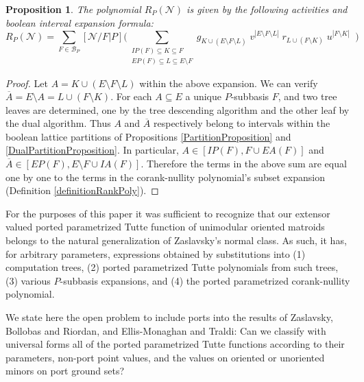\documentclass[12pt]{article}
\newcommand \comment[1]{}                       %
\renewcommand \comment[1]{\emph{#1}}            %
\newtheorem{proposition}[theorem]{Proposition}
\theoremstyle{definition}
\newcommand{\scomp}[1]{\ensuremath{\overline{#1}}}
\newcommand{\Card}[1]{\ensuremath{{\left|#1\right|}}}
\begin{document}
\begin{proposition}
The polynomial $R_P(\mathcal{N})$ is given
by the following activities and boolean interval expansion formula:
\begin{equation}
R_P(\mathcal{N})=
\sum_{F\in \mathcal{B}_P}[\mathcal{N}/F|P]
\Big(
\sum_{\substack{
       IP(F)\subseteq K \subseteq F\\
       EP(F)\subseteq L \subseteq E\setminus F
      }}
 g_{K\cup (E\setminus F\setminus L)}\;
 v^{\Card{E\setminus F\setminus L}}\;
 r_{L\cup (F\setminus K)}\;
 u^{\Card{F\setminus K}}\;\;
\Big)
\end{equation}
\end{proposition}

\begin{proof}
Let $A=K\cup (E\setminus F\setminus L)$ within the above expansion.
We can verify $\scomp{A}=E\setminus A=L\cup (F\setminus K)$.
For each $A\subseteq E$ a unique $P$-subbasis $F$, and two tree leaves
are determined, one by the tree descending algorithm and the other leaf
by the dual algorithm.  Thus $A$ and $\scomp{A}$ respectively belong
to intervals within the boolean lattice partitions of Propositions
\ref{PartitionProposition} and \ref{DualPartitionProposition}.  In particular, 
$A\in[IP(F),F\cup EA(F)]$ and 
$\scomp{A}\in[EP(F),E\setminus F\cup IA(F)]$.
Therefore the terms in the above sum are equal one by one to the terms in
the corank-nullity polynomial's subset expansion
(Definition \ref{definitionRankPoly}).
\end{proof}



For the purposes of this paper it was sufficient to recognize
that our extensor valued ported parametrized Tutte function of 
unimodular oriented matroids belongs to the natural generalization 
of Zaslavsky's normal class.  As such, it has, for arbitrary
parameters, expressions obtained by substitutions into
(1) computation trees, (2) ported parametrized Tutte polynomials
from such trees, (3) various $P$-subbasis expansions, 
and (4) the ported parametrized corank-nullity polynomial.

We state here the open problem to include ports into the results of 
Zaslavsky, Bollobas and Riordan, and Ellis-Monaghan and Traldi:
Can we classify with universal forms all of the ported parametrized Tutte
functions according to their parameters, non-port
point values, and the 
values on oriented or unoriented minors on port ground sets?  
\end{document}
